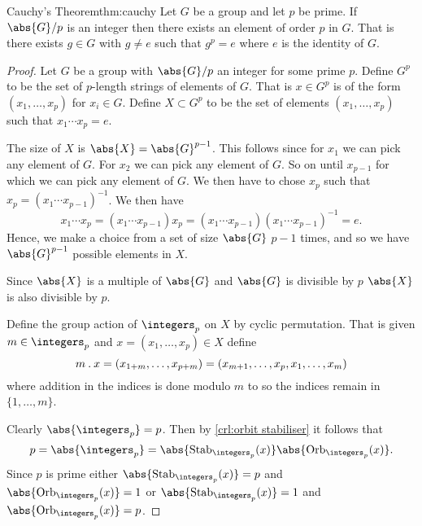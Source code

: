 \begin{thm}{Cauchy's Theorem}{thm:cauchy}
    Let \(G\) be a group and let \(p\) be prime.
    If \(\abs{G}/p\) is an integer then there exists an element of order \(p\) in \(G\).
    That is there exists \(g \in G\)  with \(g \ne e\) such that \(g^p = e\) where \(e\) is the identity of \(G\).
    
    \begin{proof}
        Let \(G\) be a group with \(\abs{G}/p\) an integer for some prime \(p\).
        Define \(G^p\) to be the set of \(p\)-length strings of elements of \(G\).
        That is \(x \in G^p\) is of the form \((x_1, \dotsc, x_p)\) for \(x_i \in G\).
        Define \(X \subset G^p\) to be the set of elements \((x_1, \dotsc, x_p)\) such that \(x_1 \dotsm x_p = e\).
        
        The size of \(X\) is \(\abs{X} = \abs{G}^{p-1}\).
        This follows since for \(x_1\) we can pick any element of \(G\).
        For \(x_2\) we can pick any element of \(G\).
        So on until \(x_{p-1}\) for which we can pick any element of \(G\).
        We then have to chose \(x_p\) such that \(x_p = (x_1 \dotsm x_{p-1})^{-1}\).
        We then have
        \begin{equation}
            x_1 \dotsm x_p = (x_1 \dotsm x_{p-1})x_p = (x_1 \dotsm x_{p-1})(x_1 \dotsm x_{p-1})^{-1} = e.
        \end{equation}
        Hence, we make a choice from a set of size \(\abs{G}\) \(p-1\) times, and so we have \(\abs{G}^{p-1}\) possible elements in \(X\).
        
        Since \(\abs{X}\) is a multiple of \(\abs{G}\) and \(\abs{G}\) is divisible by \(p\) \(\abs{X}\) is also divisible by \(p\).
        
        Define the group action of \(\integers_p\) on \(X\) by cyclic permutation.
        That is given \(m \in \integers_p\) and \(x = (x_1, \dotsc, x_p) \in X\) define
        \begin{equation}
            m\mathbin{.} x = (x_{1 + m}, \dotsc, x_{p + m}) = (x_{m+1}, \dotsc, x_p, x_1, \dotsc, x_m)
        \end{equation}
        where addition in the indices is done modulo \(m\) to so the indices remain in \(\{1, \dotsc, m\}\).
        
        Clearly \(\abs{\integers_p} = p\).
        Then by \cref{crl:orbit stabiliser} it follows that
        \begin{equation}
            p = \abs{\integers_p} = \abs{\Stab_{\integers_p}(x)}\abs{\Orb_{\integers_p}(x)}.
        \end{equation}
        Since \(p\) is prime either \(\abs{\Stab_{\integers_p}(x)} = p\) and \(\abs{\Orb_{\integers_p}(x)} = 1\) or \(\abs{\Stab_{\integers_p}(x)} = 1\) and \(\abs{\Orb_{\integers_p}(x)} = p\).
        

\end{proof}
\end{thm}
